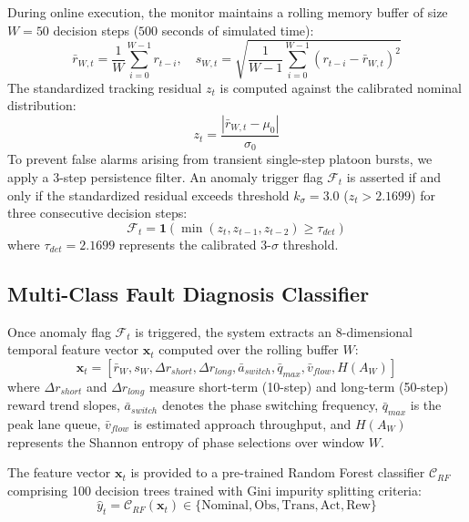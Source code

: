 \documentclass{ieeeaccess}
\begin{document}
During online execution, the monitor maintains a rolling memory buffer of size $W = 50$ decision steps ($500$ seconds of simulated time):
\begin{equation}
\bar{r}_{W, t} = \frac{1}{W} \sum_{i=0}^{W-1} r_{t-i}, \quad s_{W, t} = \sqrt{\frac{1}{W-1} \sum_{i=0}^{W-1} (r_{t-i} - \bar{r}_{W, t})^2}
\end{equation}
The standardized tracking residual $z_t$ is computed against the calibrated nominal distribution:
\begin{equation}
z_t = \frac{|\bar{r}_{W, t} - \mu_0|}{\sigma_0}
\label{eq:z_score}
\end{equation}
To prevent false alarms arising from transient single-step platoon bursts, we apply a 3-step persistence filter. An anomaly trigger flag $\mathcal{F}_t$ is asserted if and only if the standardized residual exceeds threshold $k_\sigma = 3.0$ ($z_t > 2.1699$) for three consecutive decision steps:
\begin{equation}
\mathcal{F}_t = \mathbf{1}\left( \min(z_t, z_{t-1}, z_{t-2}) \ge \tau_{det} \right)
\end{equation}
where $\tau_{det} = 2.1699$ represents the calibrated 3-$\sigma$ threshold.

\subsection{Multi-Class Fault Diagnosis Classifier}
Once anomaly flag $\mathcal{F}_t$ is triggered, the system extracts an 8-dimensional temporal feature vector $\mathbf{x}_t$ computed over the rolling buffer $W$:
\begin{equation}
\mathbf{x}_t = \left[ \bar{r}_W, s_W, \Delta r_{short}, \Delta r_{long}, \bar{a}_{switch}, \bar{q}_{max}, \bar{v}_{flow}, H(A_W) \right]
\end{equation}
where $\Delta r_{short}$ and $\Delta r_{long}$ measure short-term (10-step) and long-term (50-step) reward trend slopes, $\bar{a}_{switch}$ denotes the phase switching frequency, $\bar{q}_{max}$ is the peak lane queue, $\bar{v}_{flow}$ is estimated approach throughput, and $H(A_W)$ represents the Shannon entropy of phase selections over window $W$.

The feature vector $\mathbf{x}_t$ is provided to a pre-trained Random Forest classifier $\mathcal{C}_{RF}$ comprising 100 decision trees trained with Gini impurity splitting criteria:
\begin{equation}
\hat{y}_t = \mathcal{C}_{RF}(\mathbf{x}_t) \in \{\text{Nominal}, \text{Obs}, \text{Trans}, \text{Act}, \text{Rew}\}
\end{equation}
\end{document}
